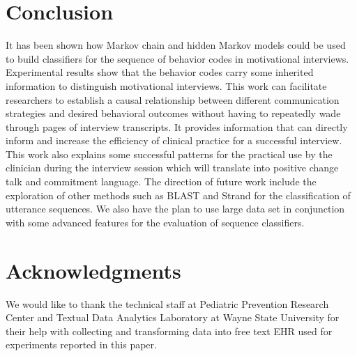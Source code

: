 \documentclass{amia}
\begin{document}
\section*{Conclusion}
It has been shown how Markov chain and hidden Markov models could be used to build classifiers for the sequence of behavior codes in motivational interviews. Experimental results show that the behavior codes carry some inherited information to distinguish motivational interviews. This work can facilitate researchers to establish a causal relationship between different communication strategies and desired behavioral outcomes without having to repeatedly wade through pages of interview transcripts. It provides information that can directly inform and increase the efficiency of clinical practice for a successful interview. This work also explains some successful patterns for the practical use by the clinician during the interview session which will translate into positive change talk and commitment language. The direction of future work include the exploration of other methods such as BLAST \cite{altschul1990basic} and Strand \cite{drew2014strand} for the classification of utterance sequences. We also have the plan to use large data set in conjunction with some advanced features for the evaluation of sequence classifiers. 


\section*{Acknowledgments}
We would like to thank the technical staff at Pediatric Prevention Research Center and Textual Data Analytics Laboratory at Wayne State University for their help with collecting and transforming data into free text EHR used for experiments reported in this paper. 



\end{document}
